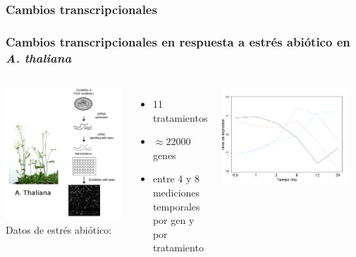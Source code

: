 \documentclass[serif,9pt, t]{beamer}
\begin{document}
\subsubsection*{Cambios transcripcionales}
\begin{frame}
	\frametitle{Cambios transcripcionales en respuesta a estrés abiótico en \textit{A. thaliana}} 
	\begin{columns}[T]
			\includegraphics[width=1\textwidth]{micromatriz_y_arabidopsis}
			\bigskip
			\Large 
			Datos de estrés abiótico:
			\medskip
			\begin{itemize}
				\item 11 tratamientos
				\item $\approx 22000$ genes
				\item entre 4 y 8 mediciones temporales por gen y por tratamiento 
			\end{itemize}			
			\centering	
			\includegraphics[width=0.9\textwidth]{perfiles_sin_agrupar.pdf}			

\end{columns}
\end{frame}
\end{document}
